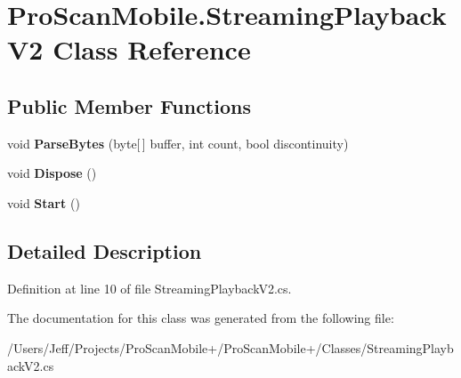 \hypertarget{class_pro_scan_mobile_1_1_streaming_playback_v2}{\section{Pro\-Scan\-Mobile.\-Streaming\-Playback\-V2 Class Reference}
\label{class_pro_scan_mobile_1_1_streaming_playback_v2}
}
\subsection*{Public Member Functions}
\begin{DoxyCompactItemize}
\item 
\hypertarget{class_pro_scan_mobile_1_1_streaming_playback_v2_a5e7cffcd39a6de557f29b791836f5ad3}{void {\bfseries Parse\-Bytes} (byte\mbox{[}$\,$\mbox{]} buffer, int count, bool discontinuity)}\label{class_pro_scan_mobile_1_1_streaming_playback_v2_a5e7cffcd39a6de557f29b791836f5ad3}

\item 
\hypertarget{class_pro_scan_mobile_1_1_streaming_playback_v2_a6e9291be5fcb6b99732cf032bd72db90}{void {\bfseries Dispose} ()}\label{class_pro_scan_mobile_1_1_streaming_playback_v2_a6e9291be5fcb6b99732cf032bd72db90}

\item 
\hypertarget{class_pro_scan_mobile_1_1_streaming_playback_v2_a73a502415b5f5458b383d7d74382b3d5}{void {\bfseries Start} ()}\label{class_pro_scan_mobile_1_1_streaming_playback_v2_a73a502415b5f5458b383d7d74382b3d5}

\end{DoxyCompactItemize}


\subsection{Detailed Description}


Definition at line 10 of file Streaming\-Playback\-V2.\-cs.



The documentation for this class was generated from the following file\-:\begin{DoxyCompactItemize}
\item 
/\-Users/\-Jeff/\-Projects/\-Pro\-Scan\-Mobile+/\-Pro\-Scan\-Mobile+/\-Classes/Streaming\-Playback\-V2.\-cs\end{DoxyCompactItemize}
